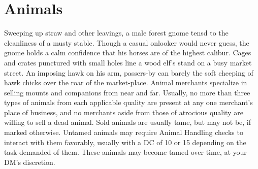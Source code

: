 \documentclass[10pt,a4paper,twoside,twocolumn,openany,nodeprecatedcode,bg=print]{dndbook}
\begin{document}
\section{Animals}
Sweeping up straw and other leavings, a male forest gnome tensd to the cleanliness of a musty stable.
Though a casual onlooker would never guess, the gnome holds a calm confidence that his horses are of the highest calibur.
Cages and crates punctured with small holes line a wood elf's stand on a busy market street. An imposing hawk on his arm, passers-by can barely the soft cheeping of hawk chicks over the roar of the market-place.
Animal merchants specialize in selling mounts and companions from near and far. Usually, no more than three types of animals from each applicable quality are present at any one merchant's place of business, and no merchants aside from those of atrocious quality are willing to sell a dead animal.
Sold animals are usually tame, but may not be, if marked otherwise. Untamed animals may require Animal Handling checks to interact with them favorably, usually with a DC of 10 or 15 depending on the task demanded of them. These animals may become tamed over time, at your DM's discretion.
\end{document}
